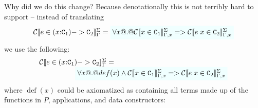 \documentclass[preprint,nocopyrightspace]{sigplanconf}
\begin{document}
\newcommand{\definable}[1]{{\mathop{def}}(#1)}

Why did we do this change? Because denotationally this is not terribly hard to support -- instead of translating 
\[\begin{array}{l}
  \ctrans{\Sigma}{\Gamma}{e \in (x{:}\Ct_1) -> \Ct_2} =  
  \formula{\forall x @.@ \ctrans{\Sigma}{\Gamma,x}{x \in \Ct_1} => \ctrans{\Sigma}{\Gamma,x}{e\;x \in \Ct_2}}
\end{array}\] 
we use the following:
\[\begin{array}{l}
  \ctrans{\Sigma}{\Gamma}{e \in (x{:}\Ct_1) -> \Ct_2} = \\ 
  \qquad\qquad\quad 
\formula{\forall x @.@ \definable{x} \land \ctrans{\Sigma}{\Gamma,x}{x \in \Ct_1} => \ctrans{\Sigma}{\Gamma,x}{e\;x \in \Ct_2}}
\end{array}\] 
where $\definable{x}$ could be axiomatized as containing all terms 
made up of the functions in $P$, applications, and data constructors:
\end{document}

